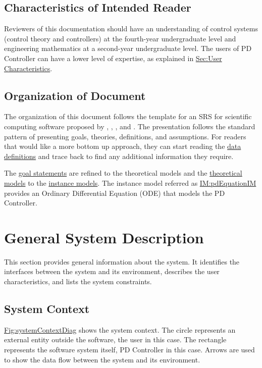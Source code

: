 \documentclass[12pt]{article}
\begin{document}
\subsection{Characteristics of Intended Reader}
\label{Sec:ReaderChars}
Reviewers of this documentation should have an understanding of control systems (control theory and controllers) at the fourth-year undergraduate level and engineering mathematics at a second-year undergraduate level. The users of PD Controller can have a lower level of expertise, as explained in \hyperref[Sec:UserChars]{Sec:User Characteristics}.

\subsection{Organization of Document}
\label{Sec:DocOrg}
The organization of this document follows the template for an SRS for scientific computing software proposed by \cite{koothoor2013}, \cite{smithLai2005}, \cite{smithEtAl2007}, and \cite{smithKoothoor2016}. The presentation follows the standard pattern of presenting goals, theories, definitions, and assumptions. For readers that would like a more bottom up approach, they can start reading the \hyperref[Sec:IMs]{data definitions} and trace back to find any additional information they require.

The \hyperref[Sec:GoalStmt]{goal statements} are refined to the theoretical models and the \hyperref[Sec:TMs]{theoretical models} to the \hyperref[Sec:IMs]{instance models}. The instance model referred as \hyperref[IM:pdEquationIM]{IM:pdEquationIM} provides an Ordinary Differential Equation (ODE) that models the PD Controller.

\section{General System Description}
\label{Sec:GenSysDesc}
This section provides general information about the system. It identifies the interfaces between the system and its environment, describes the user characteristics, and lists the system constraints.

\subsection{System Context}
\label{Sec:SysContext}
\hyperref[Figure:systemContextDiag]{Fig:systemContextDiag} shows the system context. The circle represents an external entity outside the software, the user in this case. The rectangle represents the software system itself, PD Controller in this case. Arrows are used to show the data flow between the system and its environment.
\end{document}
